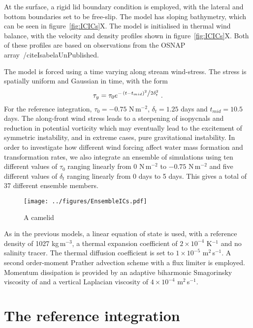 At the surface, a rigid lid boundary condition is employed, with the lateral and bottom boundaries set to be free-slip. The model has sloping bathymetry, which can be seen in  figure~\ref{fig:ICICs}X. The model is initialised in thermal wind balance, with the velocity and density profiles shown in figure~\ref{fig:ICICs}X. Both of these profiles are based on observations from the OSNAP array~/cite{IsabelaUnPublished}.

The model is forced using a time varying along stream wind-stress. The stress is spatially uniform and Gaussian in time, with the form
\begin{equation}
    \tau_y = \tau_0 e^{-\flatfrac{(t - t_{mid})^2}{2\delta_t^2}} \, .
\end{equation}
For the reference integration, $\tau_0 = - 0.75$ N\,m$^{-2}$, $\delta_t = 1.25$ days and $t_{mid} = 10.5$ days. The along-front wind stress leads to a steepening of isopycnals and reduction in potential vorticity which may eventually lead to the excitement of symmetric instability, and in extreme cases, pure gravitational instability. In order to investigate how different wind forcing affect water mass formation and transformation rates, we also integrate an ensemble of simulations using ten different values of $\tau_0$ ranging linearly from $0$ N\,m$^{-2}$ to $-0.75$ N\,m$^{-2}$ and five different values of $\delta_t$ ranging linearly from 0 days to 5 days. This gives a total of 37 different ensemble members.

\begin{figure} 
    \centering
    \texttt{[image: ../figures/EnsembleICs.pdf]}
    \caption{A camelid}
    \label{fig:EnsembleICs}
\end{figure}

As in the previous models, a linear equation of state is used, with a reference density of 1027 kg\,m$^{-3}$, a thermal expansion coefficient of $2 \times 10^{-4}$ K$^{-1}$ and no salinity tracer. The thermal diffusion coefficient is set to $1 \times 10^{-5}$ m$^2$\,s$^{-1}$. A second order-moment Prather advection scheme with a flux limiter is employed. Momentum dissipation is provided by an adaptive biharmonic Smagorinsky viscosity of and a vertical Laplacian viscosity of $4 \times 10^{-4}$ m$^2$\,s$^{-1}$.  

\section{The reference integration}



